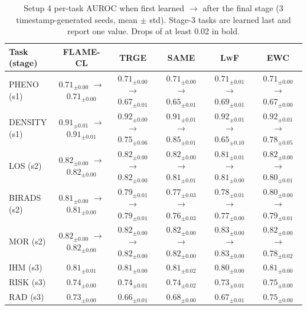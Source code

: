 \begin{table}[t]
\centering
\scriptsize
\setlength{\tabcolsep}{1.8pt}
\caption{Setup 4 per-task AUROC when first learned $\to$ after the final stage (3 timestamp-generated seeds, mean $\pm$ std). Stage-3 tasks are learned last and report one value. Drops of at least 0.02 in bold.}
\label{tab:cl-setup4-retention}
\begin{tabular}{lccccc}
\toprule
Task (stage) & \textsc{FLAME-CL} & TRGE & SAME & L\textsc{w}F & EWC \\
\midrule
PHENO (s1) & $0.71_{\pm 0.00}$ $\to$ $0.71_{\pm 0.00}$ & $0.71_{\pm 0.00}$ $\to$ $\mathbf{0.67}_{\pm 0.01}$ & $0.71_{\pm 0.00}$ $\to$ $\mathbf{0.65}_{\pm 0.01}$ & $0.71_{\pm 0.01}$ $\to$ $\mathbf{0.69}_{\pm 0.01}$ & $0.71_{\pm 0.00}$ $\to$ $\mathbf{0.67}_{\pm 0.00}$ \\
DENSITY (s1) & $0.91_{\pm 0.01}$ $\to$ $0.91_{\pm 0.01}$ & $0.92_{\pm 0.00}$ $\to$ $\mathbf{0.75}_{\pm 0.06}$ & $0.91_{\pm 0.01}$ $\to$ $\mathbf{0.85}_{\pm 0.01}$ & $0.92_{\pm 0.01}$ $\to$ $\mathbf{0.65}_{\pm 0.10}$ & $0.92_{\pm 0.01}$ $\to$ $\mathbf{0.78}_{\pm 0.05}$ \\
LOS (s2) & $0.82_{\pm 0.00}$ $\to$ $0.82_{\pm 0.00}$ & $0.82_{\pm 0.00}$ $\to$ $0.82_{\pm 0.00}$ & $0.82_{\pm 0.00}$ $\to$ $0.81_{\pm 0.01}$ & $0.81_{\pm 0.01}$ $\to$ $0.81_{\pm 0.00}$ & $0.82_{\pm 0.00}$ $\to$ $0.80_{\pm 0.01}$ \\
BIRADS (s2) & $0.81_{\pm 0.00}$ $\to$ $0.81_{\pm 0.00}$ & $0.79_{\pm 0.01}$ $\to$ $0.79_{\pm 0.01}$ & $0.77_{\pm 0.03}$ $\to$ $0.76_{\pm 0.03}$ & $0.78_{\pm 0.01}$ $\to$ $0.77_{\pm 0.00}$ & $0.80_{\pm 0.00}$ $\to$ $0.79_{\pm 0.01}$ \\
MOR (s2) & $0.82_{\pm 0.00}$ $\to$ $0.82_{\pm 0.00}$ & $0.82_{\pm 0.00}$ $\to$ $0.82_{\pm 0.00}$ & $0.82_{\pm 0.00}$ $\to$ $0.82_{\pm 0.00}$ & $0.83_{\pm 0.00}$ $\to$ $0.83_{\pm 0.00}$ & $0.82_{\pm 0.00}$ $\to$ $\mathbf{0.78}_{\pm 0.02}$ \\
IHM (s3) & $0.81_{\pm 0.01}$ & $0.81_{\pm 0.00}$ & $0.81_{\pm 0.02}$ & $0.80_{\pm 0.00}$ & $0.81_{\pm 0.00}$ \\
RISK (s3) & $0.74_{\pm 0.00}$ & $0.74_{\pm 0.01}$ & $0.74_{\pm 0.02}$ & $0.73_{\pm 0.01}$ & $0.75_{\pm 0.00}$ \\
RAD (s3) & $0.73_{\pm 0.00}$ & $0.66_{\pm 0.01}$ & $0.68_{\pm 0.00}$ & $0.67_{\pm 0.01}$ & $0.75_{\pm 0.00}$ \\
\bottomrule
\end{tabular}
\end{table}


